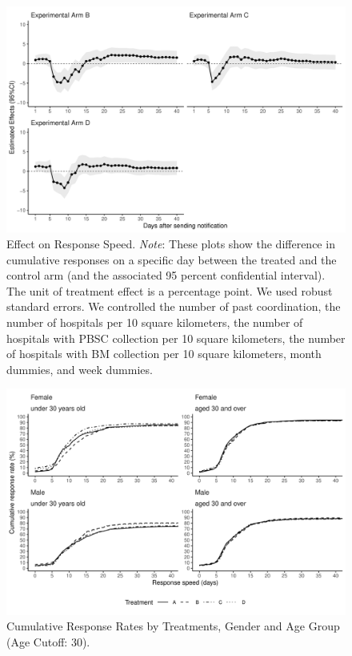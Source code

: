 \documentclass[12pt, a4paper]{article}
\begin{document}
\begin{figure}[H]
\includegraphics{JMDP RCT - Main Document_files/figure-latex/flow-1} \caption{Effect on Response Speed. \newline \emph{Note}: These plots show the difference in cumulative responses on a specific day between the treated and the control arm (and the associated 95 percent confidential interval). The unit of treatment effect is a percentage point. We used robust standard errors. We controlled the number of past coordination, the number of hospitals per 10 square kilometers, the number of hospitals with PBSC collection per 10 square kilometers, the number of hospitals with BM collection per 10 square kilometers, month dummies, and week dummies.}\label{fig:flow}
\end{figure}

\begin{figure}[H]
\includegraphics{JMDP RCT - Main Document_files/figure-latex/cumulative-response-rate-subset-1} \caption{Cumulative Response Rates by Treatments, Gender and Age Group (Age Cutoff: 30).}\label{fig:cumulative-response-rate-subset}
\end{figure}
\end{document}
